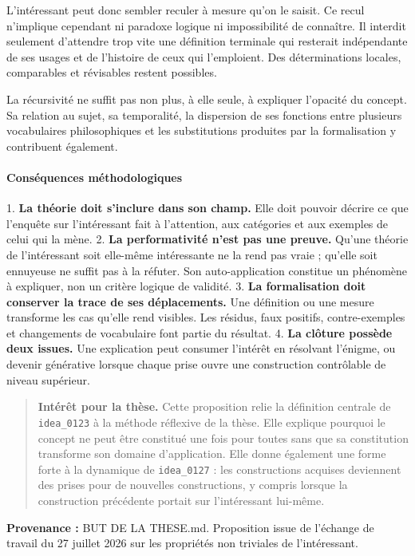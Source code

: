 \documentclass[10pt,a4paper]{article}
\begin{document}
L'intéressant peut donc sembler reculer à mesure qu'on le saisit. Ce recul n'implique cependant ni paradoxe logique ni impossibilité de connaître. Il interdit seulement d'attendre trop vite une définition terminale qui resterait indépendante de ses usages et de l'histoire de ceux qui l'emploient. Des déterminations locales, comparables et révisables restent possibles.

La récursivité ne suffit pas non plus, à elle seule, à expliquer l'opacité du concept. Sa relation au sujet, sa temporalité, la dispersion de ses fonctions entre plusieurs vocabulaires philosophiques et les substitutions produites par la formalisation y contribuent également.

\paragraph{Conséquences méthodologiques}
1. \textbf{La théorie doit s'inclure dans son champ.} Elle doit pouvoir décrire ce que    l'enquête sur l'intéressant fait à l'attention, aux catégories et aux exemples de    celui qui la mène. 2. \textbf{La performativité n'est pas une preuve.} Qu'une théorie de l'intéressant soit    elle-même intéressante ne la rend pas vraie ; qu'elle soit ennuyeuse ne suffit pas à    la réfuter. Son auto-application constitue un phénomène à expliquer, non un critère    logique de validité. 3. \textbf{La formalisation doit conserver la trace de ses déplacements.} Une définition ou    une mesure transforme les cas qu'elle rend visibles. Les résidus, faux positifs,    contre-exemples et changements de vocabulaire font partie du résultat. 4. \textbf{La clôture possède deux issues.} Une explication peut consumer l'intérêt en    résolvant l'énigme, ou devenir générative lorsque chaque prise ouvre une construction    contrôlable de niveau supérieur.

\begin{quote}
\textbf{Intérêt pour la thèse.} Cette proposition relie la définition centrale de \texttt{idea\_0123} à la méthode réflexive de la thèse. Elle explique pourquoi le concept ne peut être constitué une fois pour toutes sans que sa constitution transforme son domaine d'application. Elle donne également une forme forte à la dynamique de \texttt{idea\_0127} : les constructions acquises deviennent des prises pour de nouvelles constructions, y compris lorsque la construction précédente portait sur l'intéressant lui-même.
\end{quote}
{\footnotesize\color{metadata}\textbf{Provenance :} BUT DE LA THESE.md. Proposition issue de l'échange de travail du 27 juillet 2026 sur les propriétés non triviales de l'intéressant.\par}
\end{document}
